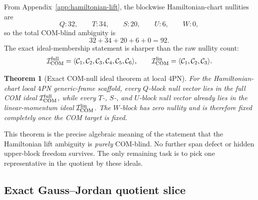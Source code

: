 \documentclass[11pt]{article}
\newtheorem{theorem}{Theorem}
\begin{document}
From Appendix~\ref{app:hamiltonian-lift}, the blockwise Hamiltonian-chart
nullities are
\begin{equation}
Q:32,
\qquad
T:34,
\qquad
S:20,
\qquad
U:6,
\qquad
W:0,
\label{eq:app-canonical-slice-block-nullities}
\end{equation}
so the total COM-blind ambiguity is
\begin{equation}
32+34+20+6+0 = 92.
\label{eq:app-canonical-slice-total-nullity}
\end{equation}
The exact ideal-membership statement is sharper than the raw nullity count:
\begin{equation}
\mathcal I_{\rm COM}^{\rm full}
=
\langle \mathcal C_1,\mathcal C_2,\mathcal C_3,\mathcal C_4,\mathcal C_5,\mathcal C_6\rangle,
\qquad
\mathcal I_{\rm COM}^{\rm lin}
=
\langle \mathcal C_1,\mathcal C_2,\mathcal C_3\rangle.
\label{eq:app-canonical-slice-ideals}
\end{equation}

\begin{theorem}[Exact COM-null ideal theorem at local $4$PN]
\label{thm:app-canonical-slice-null-ideal}
For the Hamiltonian-chart local $4$PN generic-frame scaffold, every $Q$-block
null vector lies in the full COM ideal \(\mathcal I_{\rm COM}^{\rm full}\),
while every \(T\)-, \(S\)-, and \(U\)-block null vector already lies in the
linear-momentum ideal \(\mathcal I_{\rm COM}^{\rm lin}\).  The \(W\)-block has
zero nullity and is therefore fixed completely once the COM target is fixed.
\end{theorem}

This theorem is the precise algebraic meaning of the statement that the
Hamiltonian lift ambiguity is \emph{purely} COM-blind.  No further span defect
or hidden upper-block freedom survives.  The only remaining task is to pick one
representative in the quotient by these ideals.

\subsection{Exact Gauss--Jordan quotient slice}
\label{app:canonical-slice-gauss-jordan}
\end{document}
